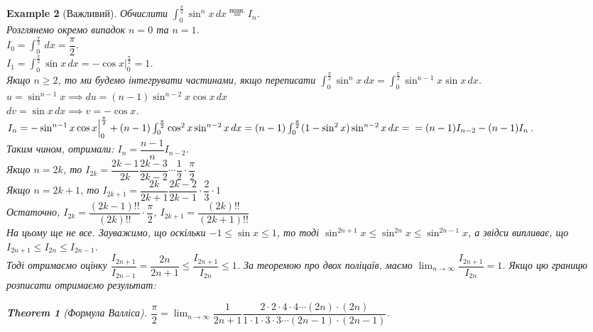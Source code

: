 \documentclass[a4paper, 10pt]{article}
\def\huge{\displaystyle}
\theoremstyle{theoremdd}
\newtheorem{theorem}{Theorem}[subsection]
\theoremstyle{theoremdd}
\theoremstyle{theoremdd}
\theoremstyle{theoremdd}
\theoremstyle{theoremdd}
\newtheorem{example}[theorem]{Example}
\theoremstyle{theoremdd}
\theoremstyle{theoremdd}
\theoremstyle{theoremdd}
\theoremstyle{theoremdd}
\begin{document}
\begin{example}[Важливий]
Обчислити $\huge\int_0^{\frac{\pi}{2}} \sin^n x \,dx \overset{\text{позн.}}{=} I_n$.\\
Розглянемо окремо випадок $n=0$ та $n=1$.\\
$I_0 = \huge\int_0^{\frac{\pi}{2}} \,dx = \dfrac{\pi}{2}$.\\
$I_1 = \huge\int_0^{\frac{\pi}{2}} \sin x\,dx = -\cos x \Big|_0^{\frac{\pi}{2}} = 1$.\\
Якщо $n \geq 2$, то ми будемо інтегрувати частинами, якщо переписати $\huge\int_0^{\frac{\pi}{2}} \sin^n x \,dx = \huge\int_0^{\frac{\pi}{2}} \sin^{n-1} x \sin x \,dx$.\\
$u = \sin^{n-1}x \implies du = (n-1) \sin^{n-2}x \cos x \,dx$\\
$dv = \sin x \,dx \implies v = -\cos x$.\\
$I_n = -\sin^{n-1}x \cos x \Big|_0^{\frac{\pi}{2}} + (n-1)\int_0^{\frac{\pi}{2}} \cos^2 x \sin^{n-2}x\,dx = (n-1)\int_0^{\frac{\pi}{2}} (1-\sin^2 x)\sin^{n-2}x\,dx = \\ = (n-1)I_{n-2} - (n-1)I_n$.\\
Таким чином, отримали: $I_n = \dfrac{n-1}{n}I_{n-2}$.\\
Якщо $n = 2k$, то $I_{2k} = \dfrac{2k-1}{2k} \dfrac{2k-3}{2k-2} \cdots \dfrac{1}{2} \cdot \dfrac{\pi}{2}$\\
Якщо $n = 2k+1$, то $I_{2k+1} = \dfrac{2k}{2k+1} \dfrac{2k-2}{2k-1} \cdot \dfrac{2}{3} \cdot 1$\\
Остаточно, $I_{2k} = \dfrac{(2k-1)!!}{(2k)!!} \cdot \dfrac{\pi}{2}$, \hspace{1cm} $I_{2k+1} = \dfrac{(2k)!!}{(2k+1)!!}$
\bigskip \\
На цьому ще не все. Зауважимо, що оскільки $-1 \leq \sin x \leq 1$, то тоді $\sin^{2n+1} x \leq \sin^{2n} x \leq \sin^{2n-1} x$, а звідси випливає, що $I_{2n+1} \leq I_{2n} \leq I_{2n-1}$.\\
Тоді отримаємо оцінку $\dfrac{I_{2n+1}}{I_{2n-1}} = \dfrac{2n}{2n+1} \leq \dfrac{I_{2n+1}}{I_{2n}} \leq 1$. За теоремою про двох поліцаїв, маємо $\huge\lim_{n \to \infty} \dfrac{I_{2n+1}}{I_{2n}} = 1$. Якщо цю границю розписати отримаємо результат:
\begin{theorem}[Формула Валліса]
$\dfrac{\pi}{2} = \huge\lim_{n \to \infty} \dfrac{1}{2n+1} \dfrac{2 \cdot 2 \cdot 4 \cdot 4 \cdots (2n) \cdot (2n)}{1 \cdot 1 \cdot 3 \cdot 3 \cdots (2n-1) \cdot (2n-1)}$.
\end{theorem}


\end{example}
\end{document}
